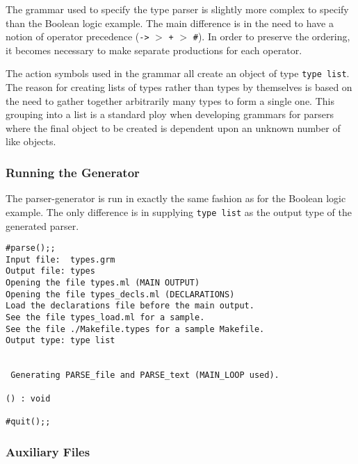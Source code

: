 The grammar used to specify the type parser is slightly more complex
to specify than the Boolean logic example.  The main difference is in
the need to have a notion of operator precedence (\verb"->" $>$ \verb"+" $>$
\verb"#").  In order to preserve the ordering, it becomes necessary to
make separate productions for each operator.

The action symbols used in the grammar all create an object of type 
\verb"type list".  The reason for creating lists of types rather than
types by themselves is based on the need to gather together arbitrarily 
many types to
form a single one.  This grouping into a list is a standard ploy when 
developing grammars for parsers where the final object to be created is
dependent upon an unknown number of like objects.

\subsubsection{Running the Generator}

The parser-generator is run in exactly the same fashion as for the
Boolean logic example.  The only difference is in supplying \verb"type list" as
the output type of the generated parser.
\setcounter{sessioncount}{1}
\begin{center}
\begin{session}
\begin{verbatim}
#parse();;
Input file:  types.grm
Output file: types
Opening the file types.ml (MAIN OUTPUT)
Opening the file types_decls.ml (DECLARATIONS)
Load the declarations file before the main output.
See the file types_load.ml for a sample.
See the file ./Makefile.types for a sample Makefile.
Output type: type list


 Generating PARSE_file and PARSE_text (MAIN_LOOP used).

() : void

#quit();;
\end{verbatim}
\end{session}
\end{center}

\subsubsection{Auxiliary Files}\label{SEPS}

